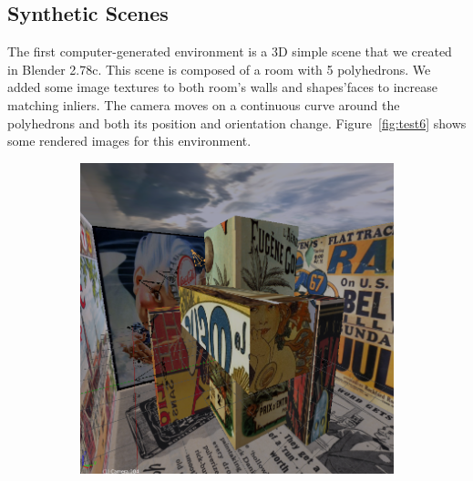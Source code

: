 \subsection{Synthetic Scenes}
The first computer-generated environment is a 3D simple scene that we created in Blender 2.78c.
This scene is composed of a room with 5 polyhedrons. We added some image textures to both
room's walls and shapes'faces to increase matching inliers.
The camera moves on a continuous curve around the polyhedrons and both its
position and orientation change.
Figure~\ref{fig:test6} shows some rendered images for this environment.
%
\begin{figure}
\centering
	\begin{subfigure}{0.4\textwidth}
		\centering
		\includegraphics[width=\textwidth]{img/test6_1}
	\end{subfigure}
	\begin{subfigure}{0.4\textwidth}
		\centering

\end{subfigure}
\end{figure}
